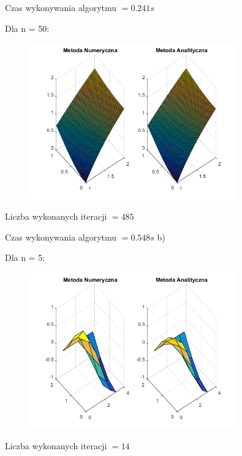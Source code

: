 Czas wykonywania algorytmu $ = 0.241 s$

Dla n = 50:

\begin{figure}[!ht]
	\begin{center}
		\includegraphics[width=0.8\textwidth]{Lab6/charts/gs/zad1/50.png}
	\end{center}
\end{figure}

Liczba wykonanych iteracji $ = 485 $

Czas wykonywania algorytmu $ = 0.548 s$
\newpage
b)

Dla n = 5:

\begin{figure}[!ht]
	\begin{center}
		\includegraphics[width=0.8\textwidth]{Lab6/charts/gs/zad2/5.png}
	\end{center}
\end{figure}

Liczba wykonanych iteracji $ = 14 $

